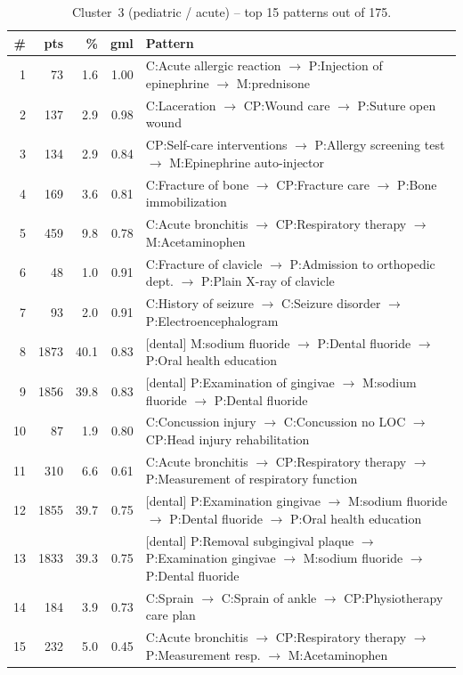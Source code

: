 \begin{table}[H]
\centering
\footnotesize
\setlength{\arraystretch}{1.05}
\begin{tabular}{@{}r r r r p{9.5cm}@{}}
\toprule
\# & pts & \% & gml & Pattern \\
\midrule
1  &   73 &  1.6 & 1.00 & C:Acute allergic reaction $\to$ P:Injection of epinephrine $\to$ M:prednisone \\
2  &  137 &  2.9 & 0.98 & C:Laceration $\to$ CP:Wound care $\to$ P:Suture open wound \\
3  &  134 &  2.9 & 0.84 & CP:Self-care interventions $\to$ P:Allergy screening test $\to$ M:Epinephrine auto-injector \\
4  &  169 &  3.6 & 0.81 & C:Fracture of bone $\to$ CP:Fracture care $\to$ P:Bone immobilization \\
5  &  459 &  9.8 & 0.78 & C:Acute bronchitis $\to$ CP:Respiratory therapy $\to$ M:Acetaminophen \\
6  &   48 &  1.0 & 0.91 & C:Fracture of clavicle $\to$ P:Admission to orthopedic dept. $\to$ P:Plain X-ray of clavicle \\
7  &   93 &  2.0 & 0.91 & C:History of seizure $\to$ C:Seizure disorder $\to$ P:Electroencephalogram \\
8  & 1873 & 40.1 & 0.83 & [dental] M:sodium fluoride $\to$ P:Dental fluoride $\to$ P:Oral health education \\
9  & 1856 & 39.8 & 0.83 & [dental] P:Examination of gingivae $\to$ M:sodium fluoride $\to$ P:Dental fluoride \\
10 &   87 &  1.9 & 0.80 & C:Concussion injury $\to$ C:Concussion no LOC $\to$ CP:Head injury rehabilitation \\
11 &  310 &  6.6 & 0.61 & C:Acute bronchitis $\to$ CP:Respiratory therapy $\to$ P:Measurement of respiratory function \\
12 & 1855 & 39.7 & 0.75 & [dental] P:Examination gingivae $\to$ M:sodium fluoride $\to$ P:Dental fluoride $\to$ P:Oral health education \\
13 & 1833 & 39.3 & 0.75 & [dental] P:Removal subgingival plaque $\to$ P:Examination gingivae $\to$ M:sodium fluoride $\to$ P:Dental fluoride \\
14 &  184 &  3.9 & 0.73 & C:Sprain $\to$ C:Sprain of ankle $\to$ CP:Physiotherapy care plan \\
15 &  232 &  5.0 & 0.45 & C:Acute bronchitis $\to$ CP:Respiratory therapy $\to$ P:Measurement resp. $\to$ M:Acetaminophen \\
\bottomrule
\end{tabular}
\caption{Cluster~3 (pediatric / acute) -- top 15 patterns out of 175.}
\label{tab:ch6_seq_c3}
\end{table}


